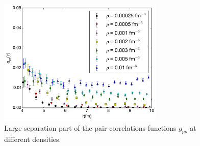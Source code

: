 \begin{figure}[h!]
   \centering
   \includegraphics[width=0.7\textwidth]{figures/gpp_small.pdf}
   \caption[Large Separation Part of the Pair Correlations Functions $g_{pp}$ at Different Densities.]{Large separation part of the pair correlations functions $g_{pp}$ at different densities.}
   \label{fig:gpp_small}
\end{figure}

